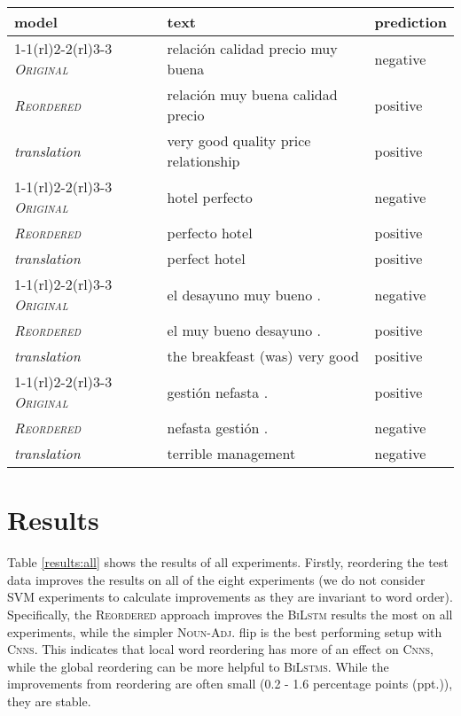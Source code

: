 \documentclass[a4paper,11pt,twocolumn,twoside]{article}
\newcommand{\original}{\textsc{Original}\xspace}
\newcommand{\mtreordered}{\textsc{Reordered}\xspace}
\newcommand{\nadj}{\textsc{Noun-Adj.}\xspace}
\newcommand{\bilstm}{\textsc{BiLstm}\xspace}
\newcommand{\bilstms}{\textsc{BiLstms}\xspace}
\newcommand{\cnns}{\textsc{Cnns}\xspace}
\begin{document}
\begin{table*}[]
\centering
\newcommand{\sepp}{\cmidrule(rl){1-1}\cmidrule(rl){2-2}\cmidrule(rl){3-3}}
\begin{tabular}{lll}
\toprule
model & text & prediction \\
\sepp
\emph{\original} & relación calidad precio muy buena & negative \\
\emph{\mtreordered} & relación muy buena calidad precio & positive \\
\textit{translation} & very good quality price relationship & positive \\
\sepp
\emph{\original} & hotel perfecto & negative \\
\emph{\mtreordered} & perfecto hotel & positive \\
\textit{translation} & perfect hotel & positive \\
\sepp
\emph{\original} & el desayuno muy bueno . & negative \\
\emph{\mtreordered} & el muy bueno desayuno . & positive \\
\textit{translation} & the breakfeast (was) very good & positive \\
\sepp
\emph{\original} & gestión nefasta . & positive \\
\emph{\mtreordered} & nefasta gestión . & negative \\
\textit{translation} & terrible management & negative \\
\bottomrule
\end{tabular}
\caption{Examples where reordering improves results over original on binary English-Spanish setup with the BiLSTM classifier}
\label{helpful_examples}

\end{table*}


\section{Results}


Table \ref{results:all} shows the results of all experiments. Firstly, reordering the test data improves the results on all of the eight experiments (we do not consider SVM experiments to calculate improvements as they are invariant to word order). Specifically, the \mtreordered approach improves the \bilstm results the most on all experiments, while the simpler \nadj flip is the best performing setup with \cnns. This indicates that local word reordering has more of an effect on \cnns, while the global reordering can be more helpful to \bilstms. While the improvements from reordering are often small (0.2 - 1.6 percentage points (ppt.)), they are stable. 
\end{document}
